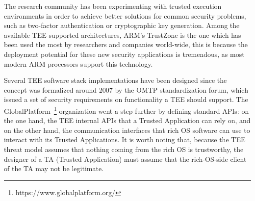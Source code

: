 The research community has been experimenting with trusted execution environments in order to achieve better solutions for common security problems, such as two-factor authentication or cryptographic key generation.
Among the available \ac{TEE} supported architectures, ARM's TrustZone is the one which has been used the most by researchers and companies world-wide, this is because the deployment potential for these new security applications is tremendous, as most modern ARM processors support this technology.

Several \ac{TEE} software stack implementations have been designed since the concept was formalized around 2007 by the OMTP standardization forum, which issued a set of security requirements on functionality a TEE should support. The GlobalPlatform~\footnote{https://www.globalplatform.org/} organization went a step further by defining standard APIs: on the one hand, the TEE internal APIs that a Trusted Application can rely on, and on the other hand, the communication interfaces that rich OS software can use to interact with its Trusted Applications. It is worth noting that, because the TEE threat model assumes that nothing coming from the rich OS is trustworthy, the designer of a TA (Trusted Application) must assume that the rich-OS-side client of the TA may not be legitimate.


